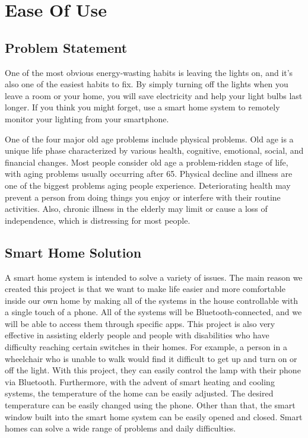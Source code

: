 \section{Ease Of Use}
\subsection{Problem Statement}
One of the most obvious energy-wasting habits is leaving the lights on, and it’s also one of the easiest habits to fix. By simply turning off the lights when you leave a room or your home, you will save electricity and help your light bulbs last longer. If you think you might forget, use a smart home system to remotely monitor your lighting from your smartphone.

One of the four major old age problems include physical problems. Old age is a unique life phase characterized by various health, cognitive, emotional, social, and financial changes. Most people consider old age a problem-ridden stage of life, with aging problems usually occurring after 65. Physical decline and illness are one of the biggest problems aging people experience. Deteriorating health may prevent a person from doing things you enjoy or interfere with their routine activities. Also, chronic illness in the elderly may limit or cause a loss of independence, which is distressing for most people. 

\subsection{Smart Home Solution}
A smart home system is intended to solve a variety of issues. The main reason we created this project is that we want to make life easier and more comfortable inside our own home by making all of the systems in the house controllable with a single touch of a phone. All of the systems will be Bluetooth-connected, and we will be able to access them through specific apps. This project is also very effective in assisting elderly people and people with disabilities who have difficulty reaching certain switches in their homes. For example, a person in a wheelchair who is unable to walk would find it difficult to get up and turn on or off the light. With this project, they can easily control the lamp with their phone via Bluetooth. Furthermore, with the advent of smart heating and cooling systems, the temperature of the home can be easily adjusted. The desired temperature can be easily changed using the phone. Other than that, the smart window built into the smart home system can be easily opened and closed. Smart homes can solve a wide range of problems and daily difficulties.

